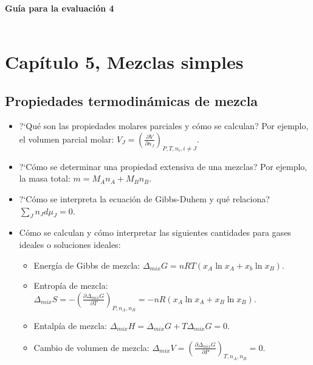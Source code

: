 \documentclass[a4paper,12pt]{article}
\begin{document}

\begin{center}
\HRule \\[0.4cm]
{ \bfseries Gu\'ia para la evaluaci\'on 4}\\ %
\HRule \\[0.4cm]
\end{center}


\section*{Cap\'itulo 5, Mezclas simples}

\subsection*{Propiedades termodin\'amicas de mezcla}

\begin{itemize}
 \item ?`Qu\'e son las propiedades molares parciales y c\'omo se calculan? Por ejemplo, el volumen parcial molar: $V_J=\left(\frac{\partial V}{\partial n_J}\right)_{P,T,n_i,i\neq J}$.
 \item ?`C\'omo se determinar una propiedad extensiva de una mezclas? Por ejemplo, la masa total: $m=M_An_A+M_Bn_B$.
 \item ?`C\'omo se interpreta la ecuaci\'on de Gibbs-Duhem y qu\'e relaciona? $\sum_J n_Jd\mu_J=0$.
 \item C\'omo se calculan y c\'omo interpretar las siguientes cantidades para gases ideales o soluciones ideales:
 \begin{itemize}
  \item Energ\'ia de Gibbs de mezcla: $\Delta_{mix}G=nRT(x_A\ln x_A+x_b\ln x_B)$.
  \item Entrop\'ia de mezcla: $\Delta_{mix}S=-\left(\frac{\partial\Delta_{mix}G}{\partial T}\right)_{P,n_A,n_B}=-nR(x_A\ln x_A+x_B\ln x_B)$.
  \item Entalp\'ia de mezcla: $\Delta_{mix}H=\Delta_{mix}G+T\Delta_{mix}G=0$.
  \item Cambio de volumen de mezcla: $\Delta_{mix}V=\left(\frac{\partial\Delta_{mix}G}{\partial P}\right)_{T,n_A,n_B}=0$.
 \end{itemize}
\end{itemize}
\end{document}
